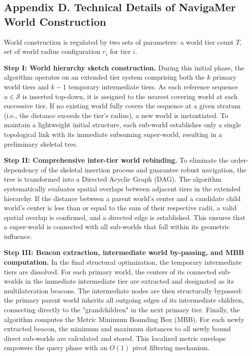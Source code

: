 \documentclass[10pt,runningheads]{llncs}
\begin{document}
\newpage
\subsection*{Appendix D. Technical Details of NavigaMer World Construction}


World construction is regulated by two sets of parameters:
a world tier count $T$, set of world radius configuration $r_i$ for tier $i$.

\textbf{Step I: World hierarchy sketch construction.} 
During this initial phase, the algorithm operates on an extended tier system comprising both the $k$ primary world tiers and $k-1$ temporary intermediate tiers. As each reference sequence $u \in \mathcal{S}$ is inserted top-down, it is assigned to the nearest covering world at each successive tier. If no existing world fully covers the sequence at a given stratum (i.e., the distance exceeds the tier's radius), a new world is instantiated. To maintain a lightweight initial structure, each sub-world establishes only a single topological link with its immediate subsuming super-world, resulting in a preliminary skeletal tree.

\textbf{Step II: Comprehensive inter-tier world rebinding.} 
To eliminate the order-dependency of the skeletal insertion process and guarantee robust navigation, the tree is transformed into a Directed Acyclic Graph (DAG). The algorithm systematically evaluates spatial overlaps between adjacent tiers in the extended hierarchy. If the distance between a parent world's center and a candidate child world's center is less than or equal to the sum of their respective radii, a valid spatial overlap is confirmed, and a directed edge is established. This ensures that a super-world is connected with all sub-worlds that fall within its geometric influence.

\textbf{Step III: Beacon extraction, intermediate world by-passing, and MBB computation.} 
In the final structural optimization, the temporary intermediate tiers are dissolved. For each primary world, the centers of its connected sub-worlds in the immediate intermediate tier are extracted and designated as its multilateration beacons. The intermediate nodes are then structurally bypassed: the primary parent world inherits all outgoing edges of its intermediate children, connecting directly to the "grandchildren" in the next primary tier. Finally, the algorithm computes the Metric Minimum Bounding Box (MBB). For each newly extracted beacon, the minimum and maximum distances to all newly bound direct sub-worlds are calculated and stored. This localized metric envelope empowers the query phase with an $O(1)$ pivot filtering mechanism.
\end{document}
